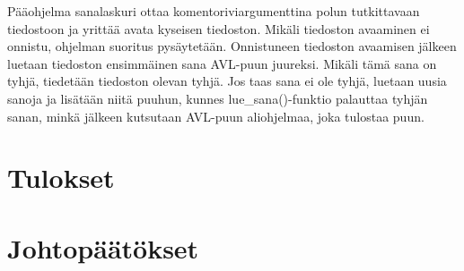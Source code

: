 \documentclass[12pt,a4paper,titlepage]{article}
\begin{document}
Pääohjelma sanalaskuri ottaa komentoriviargumenttina polun tutkittavaan tiedostoon ja yrittää avata kyseisen tiedoston. Mikäli tiedoston avaaminen ei onnistu, ohjelman suoritus pysäytetään. Onnistuneen tiedoston avaamisen jälkeen luetaan tiedoston ensimmäinen sana AVL-puun juureksi. Mikäli tämä sana on tyhjä, tiedetään tiedoston olevan tyhjä. Jos taas sana ei ole tyhjä, luetaan uusia sanoja ja lisätään niitä puuhun, kunnes lue\_sana()-funktio palauttaa tyhjän sanan, minkä jälkeen kutsutaan AVL-puun aliohjelmaa, joka tulostaa puun.

\section{Tulokset}

\section{Johtopäätökset}

\newpage

 
%
\end{document}
